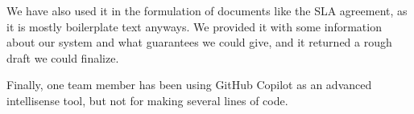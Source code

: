 \noindent We have also used it in the formulation of documents like the SLA agreement, as it is mostly boilerplate text anyways. We provided it with some information about our system and what guarantees we could give, and it returned a rough draft we could finalize.

\noindent Finally, one team member has been using GitHub Copilot as an advanced intellisense tool, but not for making several lines of code.